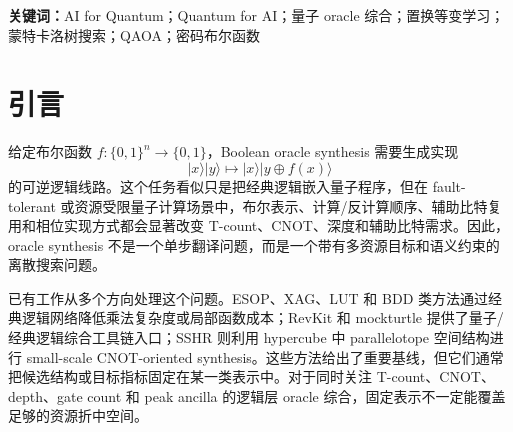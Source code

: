 \documentclass[UTF8,fontset=fandol,11pt]{ctexart}
\newcommand{\qaoa}{\ensuremath{\mathrm{QAOA}}}
\newcommand{\xor}{\ensuremath{\oplus}}
\begin{document}
\begin{abstract}
在后续的冻结检验中，执行感知 \qaoa{} 相对历史 \qaoa{} 的原生双比特门数差为 $-513.9375$，按 AES 输出坐标聚类的 95\% bootstrap 区间为 $[-2059.0625,589.9375]$，仍未通过改善门；这些 AES 坐标已在 E4 中出现，因而只构成 post-E4 复现而非泛化证据。进一步使用训练来源闭合的模型检验 ASCON 与 PRESENT 外部密码族时，标量坐标表示分别只产生 0 与 6 个可调度组。尽管事后负向审计对 90/90 条记录重建了搜索、线路和原生端点，预设的逐家族活动门仍失败，性能端点不能接受。两项负结果把尚未解决的问题从“怎样继续调权”收缩为“怎样构造同时可验证且具有可调度共享结构的多输出表示”。

最后，E6-MSO 在单配置、确定性串行运行条件下贯通了 replay--head--开发评估链。初始实验中，\qaoa{} 最终测量边际标签相对同 counts 的置换对照使资源比 $Y$ 增加 $0.094978$（越低越好）；D1 随后把主要失效定位为标签语义，而非 value 分支。D2 因而只把 teacher 改为“观测到的可行联合子集所产生的正向整程序资源增益”，保持候选池、模型、预算和优化器不变。在 32 个 structured validation 函数与 32 个 $n=4,5$ OOD 函数上，增益标签相对其置换对照的平均 $\Delta Y$ 分别为 $-0.168879$（胜/平/负 32/0/0）和 $-0.153511$（31/1/0）；但相对 greedy 仍分别高 $0.005990$ 和 $0.018765$。96/96 个 teacher case 可用，704/704 条程序语义检查通过且无 fallback 或 degraded。该结果只支持“资源对齐标签修复了原有有害关联”这一开发机制结论，不构成正式性能评估、硬件执行或量子优势证据。
\end{abstract}

\noindent\textbf{关键词：}AI for Quantum；Quantum for AI；量子 oracle 综合；置换等变学习；蒙特卡洛树搜索；QAOA；密码布尔函数

\section{引言}

给定布尔函数 $f:\{0,1\}^n\rightarrow\{0,1\}$，Boolean oracle synthesis 需要生成实现
\begin{equation}
  |x\rangle |y\rangle \mapsto |x\rangle |y\xor f(x)\rangle
  \label{eq:oracle}
\end{equation}
的可逆逻辑线路。这个任务看似只是把经典逻辑嵌入量子程序，但在 fault-tolerant 或资源受限量子计算场景中，布尔表示、计算/反计算顺序、辅助比特复用和相位实现方式都会显著改变 T-count、CNOT、深度和辅助比特需求。因此，oracle synthesis 不是一个单步翻译问题，而是一个带有多资源目标和语义约束的离散搜索问题。

已有工作从多个方向处理这个问题。ESOP、XAG、LUT 和 BDD 类方法通过经典逻辑网络降低乘法复杂度或局部函数成本\cite{wille2009bdd,meuli2020ros,meuli2022xag}；RevKit 和 mockturtle 提供了量子/经典逻辑综合工具链入口\cite{soeken2018epfl,revkit,mockturtle}；SSHR 则利用 hypercube 中 parallelotope 空间结构进行 small-scale CNOT-oriented synthesis\cite{zheng2025sshr}。这些方法给出了重要基线，但它们通常把候选结构或目标指标固定在某一类表示中。对于同时关注 T-count、CNOT、depth、gate count 和 peak ancilla 的逻辑层 oracle 综合，固定表示不一定能覆盖足够的资源折中空间。
\end{document}
